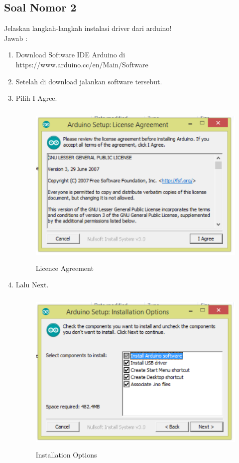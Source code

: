 \subsection{Soal Nomor 2}
Jelaskan langkah-langkah instalasi driver dari arduino!\\
Jawab :
\begin{enumerate}
\item Download Software IDE Arduino di https://www.arduino.cc/en/Main/Software
\item Setelah di download jalankan software tersebut.

\item Pilih I Agree.
\begin{figure}[!htbp]
  \centering
  \includegraphics[height=8cm]{figures/5/1174076/Teori/1.PNG}
  \caption{Licence Agreement}
\end{figure}

\item Lalu Next.
\begin{figure}[!htbp]
  \centering
  \includegraphics[height=8cm]{figures/5/1174076/Teori/2.PNG}
  \caption{Installation Options}
\end{figure}


\end{enumerate}
